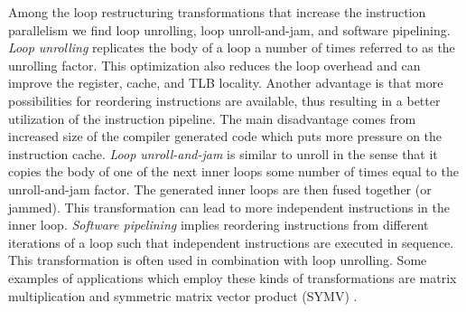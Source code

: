 Among the loop restructuring transformations that increase the instruction
parallelism we find loop unrolling, loop unroll-and-jam, and software
pipelining. \textit{Loop unrolling} replicates the body of a loop a number of
times referred to as the unrolling factor. This optimization also reduces the loop
overhead and can improve the register, cache, and TLB locality. Another
advantage is that more possibilities for reordering instructions are available,
thus resulting in a better utilization of the instruction pipeline. The main
disadvantage comes from increased size of the compiler generated code which puts
more pressure on the instruction cache. \textit{Loop unroll-and-jam} is similar
to unroll in the sense that it copies the body of one of the next inner loops some number
of times equal to the unroll-and-jam factor. The generated inner loops are then
fused together (or jammed). This transformation can lead to more independent
instructions in the inner loop. \textit{Software pipelining} implies reordering
instructions from different iterations of a loop such that independent
instructions are executed in sequence. This transformation is often used in
combination with loop unrolling. Some examples of applications which employ
these kinds of transformations are matrix multiplication and symmetric matrix
vector product (SYMV) \cite{Nath:2011:OSD:2063384.2063392}.

